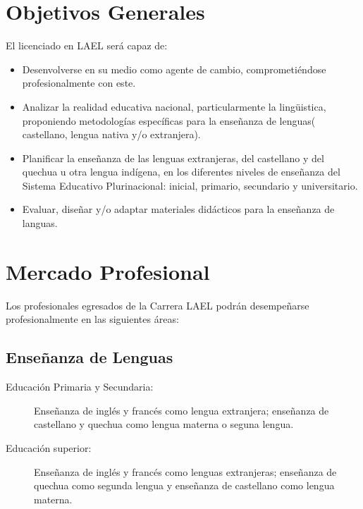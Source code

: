 \section{Objetivos Generales}

El licenciado en LAEL ser\'{a} capaz de:

\begin{itemize}

\item Desenvolverse en su medio como agente de cambio, comprometi\'{e}ndose 
profesionalmente con este.

\item Analizar la realidad educativa nacional, particularmente la ling\"{u}istica,
proponiendo metodolog\'{i}as espec\'{i}ficas para la ense\~{n}anza de lenguas( 
castellano, lengua nativa y/o extranjera).

\item Planificar la ense\~{n}anza de las lenguas extranjeras, del castellano y 
del quechua u otra lengua ind\'{i}gena, en los diferentes niveles de ense\~{n}anza
del Sistema Educativo Plurinacional: inicial, primario, secundario y universitario.

\item Evaluar, dise\~{n}ar y/o adaptar materiales did\'{a}cticos para la 
ense\~{n}anza de languas.

\end{itemize}

\section{Mercado Profesional}

Los profesionales egresados de la Carrera LAEL podr\'{a}n desempe\~{n}arse 
profesionalmente en las siguientes \'{a}reas:

\subsection{Ense\~{n}anza de Lenguas}

\begin{description}
\item[Educaci\'{o}n Primaria y Secundaria:] Ense\~{n}anza de ingl\'{e}s y 
franc\'{e}s como lengua extranjera; ense\~{n}anza de castellano y quechua
como lengua materna o seguna lengua.

\item[Educaci\'{o}n superior:] Ense\~{n}anza de ingl\'{e}s y franc\'{e}s como 
lenguas extranjeras; ense\~{n}anza de quechua como segunda lengua y ense\~{n}anza
de castellano como lengua materna.

\end{description}

